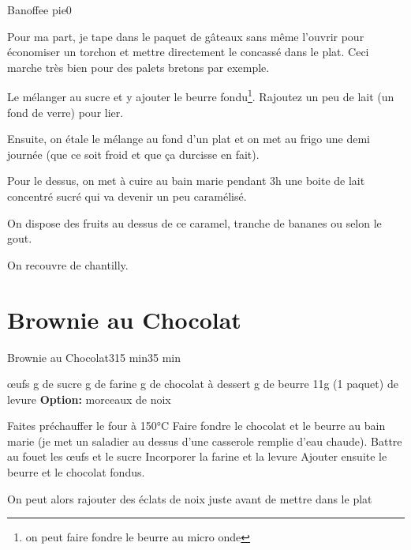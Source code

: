 {\begin{recette}{Banoffee pie}{0}{}{}
\begin{preparation}
\begin{remarque}
Pour ma part, je tape dans le paquet de gâteaux sans même l'ouvrir pour économiser un torchon et mettre directement le concassé 
dans le plat. Ceci marche très bien pour des palets bretons par exemple.
\end{remarque}

\etape Le mélanger au sucre et y ajouter le beurre fondu\footnote{on peut faire fondre le beurre au micro onde}. Rajoutez un peu 
de lait (un fond de verre) pour lier.

\etape Ensuite, on étale le mélange au fond d'un plat et on met au frigo une demi journée (que ce soit froid et que ça durcisse 
en fait).

\etape Pour le dessus, on met à cuire au bain marie pendant 3h une boite de lait concentré sucré qui va devenir un peu 
caramélisé.

\etape On dispose des fruits au dessus de ce caramel, tranche de bananes ou selon le gout.

\etape On recouvre de chantilly.
\end{preparation}
\end{recette}

\section{Brownie au Chocolat}
\begin{recette}{Brownie au Chocolat}{3}{15 min}{35 min}
\begin{ingredients}
 œufs
 g de sucre
 g de farine
 g de chocolat à dessert
 g de beurre
\ingredient 11g (1 paquet) de levure
\ingredient \textbf{Option: } morceaux de noix
\end{ingredients}

\begin{preparation}
\etape Faites préchauffer le four à 150°C
\etape Faire fondre le chocolat et le beurre au bain marie (je met un saladier au dessus d'une casserole remplie d'eau chaude).
\etape Battre au fouet les œufs et le sucre
\etape Incorporer la farine et la levure
\etape Ajouter ensuite le beurre et le chocolat fondus.
\begin{remarque}
On peut alors rajouter des éclats de noix juste avant de mettre dans le plat
\end{remarque}

\end{preparation}


\end{recette}}
